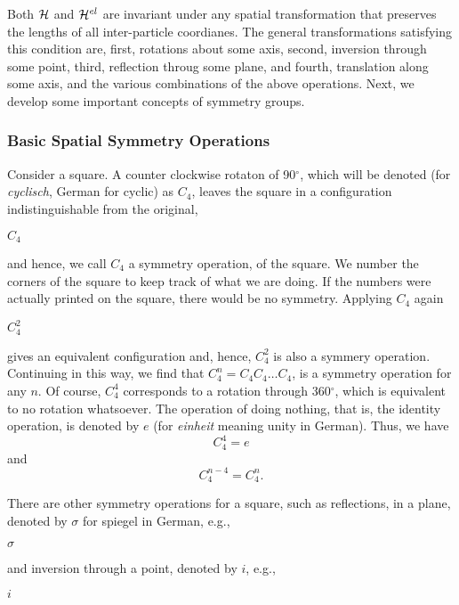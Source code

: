 Both ${\cal H}$ and ${\cal H}^{el}$ are invariant under any spatial 
transformation that preserves the lengths of all inter-particle 
coordianes.  The general transformations satisfying this condition 
are, first, rotations about some axis, second, inversion through some 
point, third, reflection throug some plane, and fourth, translation 
along some axis, and the various combinations of the above 
operations.  Next, we develop some important concepts of symmetry 
groups.

\subsubsection{Basic Spatial Symmetry Operations}

Consider a square.  A counter clockwise rotaton of 90$^{\circ}$, which
will be denoted (for \emph{cyclisch}, German for cyclic) as $C_4$,
leaves the square in a configuration indistinguishable from the
original,

$C_4$

\noindent
and hence, we call $C_4$ a symmetry operation, of the square.  We 
number the corners of the square to keep track of what we are doing.  
If the numbers were actually printed on the square, there would be no 
symmetry.  Applying $C_4$ again

$C^2_4$

\noindent
gives an equivalent configuration and, hence, $C^2_4$ is also a 
symmery operation.  Continuing in this way, we find that $C^n_4 = C_4 
C_4 \dots C_4$, is a symmetry operation for any $n$.  Of course, 
$C^4_4$ corresponds to a rotation through 360$^{\circ}$, which is 
equivalent to no rotation whatsoever.  The operation of doing nothing, 
that is, the identity operation, is denoted by $e$ (for \emph{einheit}
meaning unity in German).  Thus, we have
\begin{equation}
C^4_4 = e
\end{equation}
and
\begin{equation}
C^{n-4}_4 = C^n_4 .
\end{equation}

There are other symmetry operations for a square, such as 
reflections, in a plane, denoted by $\sigma$ for spiegel in German, 
e.g.,

$\sigma$

\noindent
and inversion through a point, denoted by $i$, e.g.,

$i$

